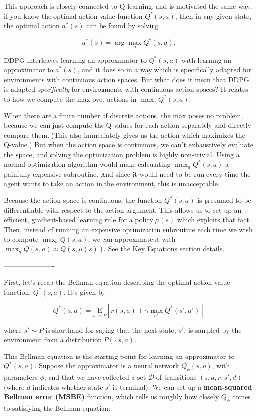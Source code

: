 This approach is closely connected to Q-learning, and is motivated the
same way: if you know the optimal action-value function \(Q^*(s,a)\),
then in any given state, the optimal action \(a^*(s)\) can be found by
solving

\[a^*(s) = \arg \max_a Q^*(s,a).\]

DDPG interleaves learning an approximator to \(Q^*(s,a)\) with learning
an approximator to \(a^*(s)\), and it does so in a way which is
specifically adapted for environments with continuous action spaces. But
what does it mean that DDPG is adapted \emph{specifically} for
environments with continuous action spaces? It relates to how we compute
the max over actions in \(\max_a Q^*(s,a)\).

When there are a finite number of discrete actions, the max poses no
problem, because we can just compute the Q-values for each action
separately and directly compare them. (This also immediately gives us
the action which maximizes the Q-value.) But when the action space is
continuous, we can't exhaustively evaluate the space, and solving the
optimization problem is highly non-trivial. Using a normal optimization
algorithm would make calculating \(\max_a Q^*(s,a)\) a painfully
expensive subroutine. And since it would need to be run every time the
agent wants to take an action in the environment, this is unacceptable.

Because the action space is continuous, the function \(Q^*(s,a)\) is
presumed to be differentiable with respect to the action argument. This
allows us to set up an efficient, gradient-based learning rule for a
policy \(\mu(s)\) which exploits that fact. Then, instead of running an
expensive optimization subroutine each time we wish to compute
\(\max_a Q(s,a)\), we can approximate it with
\(\max_a Q(s,a) \approx Q(s,\mu(s))\). See the Key Equations section
details.

----------------------

First, let's recap the Bellman equation describing the optimal
action-value function, \(Q^*(s,a)\). It's given by

\[Q^*(s,a) = \underset{s' \sim P}{{\mathrm E}}\left[r(s,a) + \gamma \max_{a'} Q^*(s', a')\right]\]

where \(s' \sim P\) is shorthand for saying that the next state, \(s'\),
is sampled by the environment from a distribution \(P(\cdot| s,a)\).

This Bellman equation is the starting point for learning an approximator
to \(Q^*(s,a)\). Suppose the approximator is a neural network
\(Q_{\phi}(s,a)\), with parameters \(\phi\), and that we have collected
a set \({\mathcal D}\) of transitions \((s,a,r,s',d)\) (where \(d\)
indicates whether state \(s'\) is terminal). We can set up a
\textbf{mean-squared Bellman error (MSBE)} function, which tells us
roughly how closely \(Q_{\phi}\) comes to satisfying the Bellman
equation:

